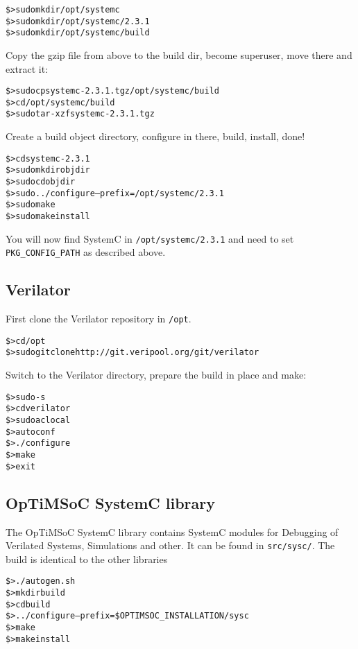 \begin{alltt}
\$> sudo mkdir /opt/systemc
\$> sudo mkdir /opt/systemc/2.3.1
\$> sudo mkdir /opt/systemc/build
\end{alltt}

Copy the gzip file from above to the build dir, become superuser, move
there and extract it:

\begin{alltt}
\$> sudo cp systemc-2.3.1.tgz /opt/systemc/build
\$> cd /opt/systemc/build
\$> sudo tar -xzf systemc-2.3.1.tgz
\end{alltt}

Create a build object directory, configure in there, build, install,
done!

\begin{alltt}
\$> cd systemc-2.3.1
\$> sudo mkdir objdir
\$> sudo cd objdir
\$> sudo ../configure --prefix=/opt/systemc/2.3.1
\$> sudo make
\$> sudo make install
\end{alltt}

You will now find SystemC in \verb|/opt/systemc/2.3.1| and need to set
\verb|PKG_CONFIG_PATH| as described above.

\subsection{Verilator}

First clone the Verilator repository in \verb|/opt|.

\begin{alltt}
\$> cd /opt
\$> sudo git clone http://git.veripool.org/git/verilator
\end{alltt}

Switch to the Verilator directory, prepare the build in place and make:

\begin{alltt}
\$> sudo -s
\$> cd verilator
\$> sudo aclocal
\$> autoconf
\$> ./configure
\$> make
\$> exit
\end{alltt}

\subsection{OpTiMSoC SystemC library}

The OpTiMSoC SystemC library contains SystemC modules for Debugging of
Verilated Systems, Simulations and other. It can be found in
\verb|src/sysc/|. The build is identical to the other libraries

\begin{alltt}
\$> ./autogen.sh
\$> mkdir build
\$> cd build
\$> ../configure --prefix=\$OPTIMSOC_INSTALLATION/sysc
\$> make
\$> make install
\end{alltt}


